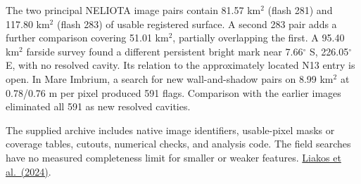 \documentclass[10pt,a4paper]{article}
\newcommand{\subhead}[1]{\vspace{2pt}{\sffamily\color{ink}\bfseries #1}\par}
\begin{document}
\subhead{Field coverage}
The two principal NELIOTA image pairs contain 81.57 km$^2$ (flash 281) and 117.80 km$^2$ (flash 283) of usable registered surface. A second 283 pair adds a further comparison covering 51.01 km$^2$, partially overlapping the first. A 95.40 km$^2$ farside survey found a different persistent bright mark near 7.66$^\circ$ S, 226.05$^\circ$ E, with no resolved cavity. Its relation to the approximately located N13 entry is open. In Mare Imbrium, a search for new wall-and-shadow pairs on 8.99 km$^2$ at 0.78/0.76 m per pixel produced 591 flags. Comparison with the earlier images eliminated all 591 as new resolved cavities.

The supplied archive includes native image identifiers, usable-pixel masks or coverage tables, cutouts, numerical checks, and analysis code. The field searches have no measured completeness limit for smaller or weaker features. \href{https://doi.org/10.1051/0004-6361/202449542}{Liakos et al.\ (2024)}.
\end{document}
